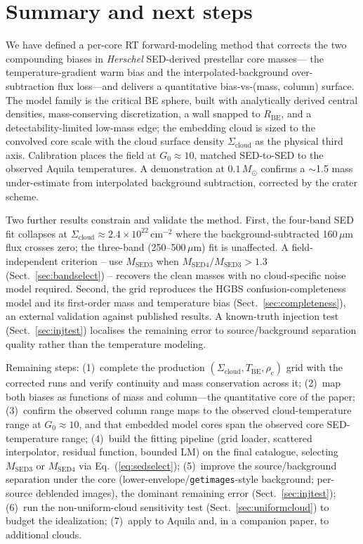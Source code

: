 \documentclass[11pt,a4paper]{article}
\newcommand{\msun}{M_{\odot}}
\newcommand{\rhoc}{\rho_{\mathrm{c}}}
\newcommand{\Rbe}{R_{\mathrm{BE}}}
\newcommand{\Tbe}{T_{\mathrm{BE}}}
\newcommand{\Scloud}{\Sigma_{\mathrm{cloud}}}
\begin{document}
\section{Summary and next steps}

We have defined a per-core RT forward-modeling method that corrects the two
compounding biases in \emph{Herschel} SED-derived prestellar core masses---
the temperature-gradient warm bias and the interpolated-background
over-subtraction flux loss---and delivers a quantitative bias-vs-(mass,
column) surface. The model family is the critical BE sphere, built with
analytically derived central densities, mass-conserving discretization, a
wall snapped to $\Rbe$, and a detectability-limited low-mass edge; the
embedding cloud is sized to the convolved core scale with the cloud surface
density $\Scloud$ as the physical third axis. Calibration places the field
at $G_{0}\approx 10$, matched SED-to-SED to the observed Aquila temperatures.
A demonstration at $0.1\,\msun$ confirms a $\sim$1.5 mass under-estimate from
interpolated background subtraction, corrected by the crater scheme.

Two further results constrain and validate the method. First, the four-band
SED fit collapses at $\Scloud\approx2.4\times10^{22}\,\mathrm{cm^{-2}}$
where the background-subtracted 160\,$\mu$m flux crosses zero; the
three-band (250--500\,$\mu$m) fit is unaffected. A field-independent
criterion -- use $M_{\mathrm{SED3}}$ when $M_{\mathrm{SED4}}/M_{\mathrm{SED3}}>1.3$
(Sect.~\ref{sec:bandselect}) -- recovers the clean masses with no cloud-specific
noise model required. Second, the grid reproduces the HGBS
confusion-completeness model and its first-order mass and temperature bias
(Sect.~\ref{sec:completeness}), an external validation against published
results. A known-truth injection test (Sect.~\ref{sec:injtest}) localises
the remaining error to source/background separation quality rather than the
temperature modeling.

Remaining steps:
(1)~complete the production $(\Scloud,\Tbe,\rhoc)$ grid with the corrected
runs and verify continuity and mass conservation across it;
(2)~map both biases as functions of mass and column---the quantitative core
of the paper;
(3)~confirm the observed column range maps to the observed cloud-temperature
range at $G_{0}\approx 10$, and that embedded model cores span the observed
core SED-temperature range;
(4)~build the fitting pipeline (grid loader, scattered interpolator,
residual function, bounded LM) on the final catalogue, selecting
$M_{\mathrm{SED3}}$ or $M_{\mathrm{SED4}}$ via Eq.~(\ref{eq:sedselect});
(5)~improve the source/background separation under the core
(lower-envelope/\texttt{getimages}-style background; per-source deblended
images), the dominant remaining error (Sect.~\ref{sec:injtest});
(6)~run the non-uniform-cloud sensitivity test (Sect.~\ref{sec:uniformcloud})
to budget the idealization;
(7)~apply to Aquila and, in a companion paper, to additional clouds.
\end{document}
